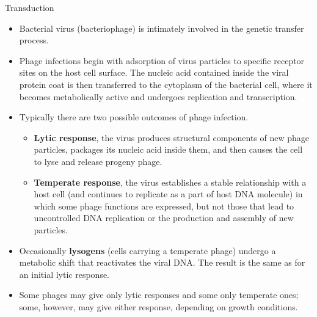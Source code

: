 \documentclass[
  ignorenonframetext,
  aspectratio=169]{beamer}
\providecommand{\tightlist}{%
  \setlength{\itemsep}{0pt}\setlength{\parskip}{0pt}}
\begin{document}
\begin{frame}{Transduction}
\protect\hypertarget{transduction}{}
\footnotesize

\begin{itemize}
\tightlist
\item
  Bacterial virus (bacteriophage) is intimately involved in the genetic
  transfer process.
\item
  Phage infections begin with adsorption of virus particles to specific
  receptor sites on the host cell surface. The nucleic acid contained
  inside the viral protein coat is then transferred to the cytoplasm of
  the bacterial cell, where it becomes metabolically active and
  undergoes replication and transcription.
\item
  Typically there are two possible outcomes of phage infection.

  \begin{itemize}
  \tightlist
  \item
    \textbf{Lytic response}, the virus produces structural components of
    new phage particles, packages its nucleic acid inside them, and then
    causes the cell to lyse and release progeny phage.
  \item
    \textbf{Temperate response}, the virus establishes a stable
    relationship with a host cell (and continues to replicate as a part
    of host DNA molecule) in which some phage functions are expressed,
    but not those that lead to uncontrolled DNA replication or the
    production and assembly of new particles.
  \end{itemize}
\item
  Occasionally \textbf{lysogens} (cells carrying a temperate phage)
  undergo a metabolic shift that reactivates the viral DNA. The result
  is the same as for an initial lytic response.
\item
  Some phages may give only lytic responses and some only temperate
  ones; some, however, may give either response, depending on growth
  conditions.
\end{itemize}
\end{frame}
\end{document}
